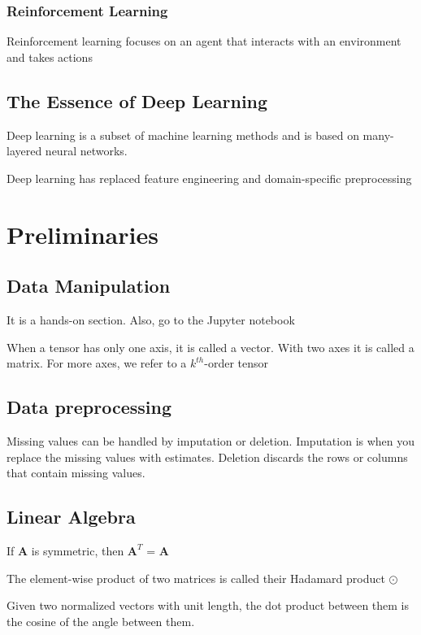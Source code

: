 \documentclass[]{article}
\begin{document}
\subsubsection{Reinforcement Learning}
Reinforcement learning focuses on an agent that interacts with an environment and
takes actions

\setcounter{subsection}{6}
\subsection{The Essence of Deep Learning}
Deep learning is a subset of machine learning methods and is based on many-layered
neural networks.

Deep learning has replaced feature engineering and domain-specific preprocessing

\section{Preliminaries}
\subsection{Data Manipulation}
It is a hands-on section. Also, go to the Jupyter notebook

When a tensor has only one axis, it is called a vector. With two axes it is called
a matrix. For more axes, we refer to a $k^{th}$-order tensor

\subsection{Data preprocessing}

Missing values can be handled by imputation or deletion. Imputation is when you
replace the missing values with estimates. Deletion discards the rows or columns
that contain missing values.

\subsection{Linear Algebra}

If \textbf{A} is symmetric, then $\textbf{A}^T$ = \textbf{A}

The element-wise product of two matrices is called their Hadamard product $\odot$

Given two normalized vectors with unit length, the dot product between them is
the cosine of the angle between them.

\setcounter{subsection}{3}
\setcounter{subsubsection}{12}
\end{document}
